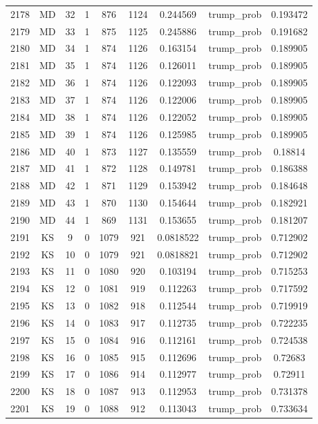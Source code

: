\documentclass[12pt,a4paper]{article}
\begin{document}
\begin{tabular}{r|cccccccc}
	2178 & MD & 32 & 1 & 876 & 1124 & 0.244569 & trump\_prob & 0.193472 \\
	2179 & MD & 33 & 1 & 875 & 1125 & 0.245886 & trump\_prob & 0.191682 \\
	2180 & MD & 34 & 1 & 874 & 1126 & 0.163154 & trump\_prob & 0.189905 \\
	2181 & MD & 35 & 1 & 874 & 1126 & 0.126011 & trump\_prob & 0.189905 \\
	2182 & MD & 36 & 1 & 874 & 1126 & 0.122093 & trump\_prob & 0.189905 \\
	2183 & MD & 37 & 1 & 874 & 1126 & 0.122006 & trump\_prob & 0.189905 \\
	2184 & MD & 38 & 1 & 874 & 1126 & 0.122052 & trump\_prob & 0.189905 \\
	2185 & MD & 39 & 1 & 874 & 1126 & 0.125985 & trump\_prob & 0.189905 \\
	2186 & MD & 40 & 1 & 873 & 1127 & 0.135559 & trump\_prob & 0.18814 \\
	2187 & MD & 41 & 1 & 872 & 1128 & 0.149781 & trump\_prob & 0.186388 \\
	2188 & MD & 42 & 1 & 871 & 1129 & 0.153942 & trump\_prob & 0.184648 \\
	2189 & MD & 43 & 1 & 870 & 1130 & 0.154644 & trump\_prob & 0.182921 \\
	2190 & MD & 44 & 1 & 869 & 1131 & 0.153655 & trump\_prob & 0.181207 \\
	2191 & KS & 9 & 0 & 1079 & 921 & 0.0818522 & trump\_prob & 0.712902 \\
	2192 & KS & 10 & 0 & 1079 & 921 & 0.0818821 & trump\_prob & 0.712902 \\
	2193 & KS & 11 & 0 & 1080 & 920 & 0.103194 & trump\_prob & 0.715253 \\
	2194 & KS & 12 & 0 & 1081 & 919 & 0.112263 & trump\_prob & 0.717592 \\
	2195 & KS & 13 & 0 & 1082 & 918 & 0.112544 & trump\_prob & 0.719919 \\
	2196 & KS & 14 & 0 & 1083 & 917 & 0.112735 & trump\_prob & 0.722235 \\
	2197 & KS & 15 & 0 & 1084 & 916 & 0.112161 & trump\_prob & 0.724538 \\
	2198 & KS & 16 & 0 & 1085 & 915 & 0.112696 & trump\_prob & 0.72683 \\
	2199 & KS & 17 & 0 & 1086 & 914 & 0.112977 & trump\_prob & 0.72911 \\
	2200 & KS & 18 & 0 & 1087 & 913 & 0.112953 & trump\_prob & 0.731378 \\
	2201 & KS & 19 & 0 & 1088 & 912 & 0.113043 & trump\_prob & 0.733634 \\

\end{tabular}
\end{document}

